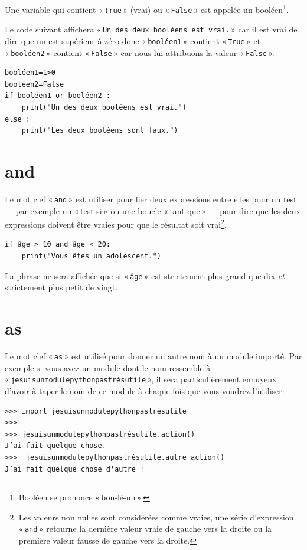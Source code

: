 Une variable qui contient « \texttt{True} » (vrai) ou « \texttt{False} » est appelée un booléen\footnote{Booléen se prononce « bou-lé-un ».}.  

Le code suivant affichera « \texttt{Un des deux booléens est vrai.} » car il est vrai de dire que un est supérieur à zéro donc « \texttt{booléen1} » contient « \texttt{True} » et « \texttt{booléen2} » contient « \texttt{False} » car nous lui attribuons la valeur « \texttt{False} ».
  
\begin{Verbatim}[frame=single,rulecolor=\color{gray}]
booléen1=1>0
booléen2=False
if booléen1 or booléen2 :
    print("Un des deux booléens est vrai.")
else :
	print("Les deux booléens sont faux.")
\end{Verbatim}

\section*{and}

Le mot clef « \texttt{and} » est utiliser pour lier deux expressions entre elles pour un test --- par exemple un « test si » ou une boucle « tant que » --- pour dire que les deux expressions doivent être vraies pour que le résultat soit vrai\footnote{Les valeurs non nulles sont considérées comme vraies, une série d'expression « \texttt{and} » retourne la dernière valeur vraie de gauche vers la droite ou la  première valeur fausse de gauche vers la droite.}.

\begin{Verbatim}[frame=single,rulecolor=\color{gray}]
if âge > 10 and âge < 20:
    print("Vous êtes un adolescent.")
\end{Verbatim}

La phrase ne sera affichée que si « \texttt{âge} » est strictement plus grand que dix \emph{et} strictement plus petit de vingt.

\section*{as}

Le mot clef « \texttt{as} » est utilisé pour donner un autre nom à un module importé. Par exemple si vous avez un module dont le nom ressemble à « \texttt{jesuisunmodulepythonpastrèsutile} », il sera particulièrement ennuyeux d'avoir à taper le nom de ce module à chaque fois que vous voudrez l'utiliser:
\begin{Verbatim}[frame=single,rulecolor=\color{gray}]
>>> import jesuisunmodulepythonpastrèsutile
>>>
>>> jesuisunmodulepythonpastrèsutile.action()
J’ai fait quelque chose.
>>>  jesuisunmodulepythonpastrèsutile.autre_action()
J’ai fait quelque chose d'autre !
\end{Verbatim}

